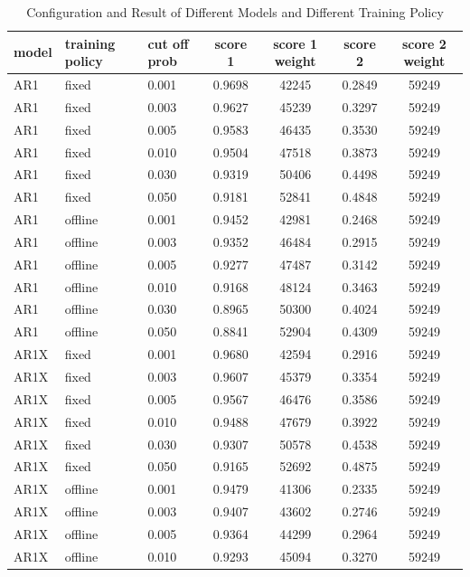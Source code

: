 \documentclass{article}
\begin{document}
\begin{longtable}[htbp]{l|l|l|*{4}{c}}
    \caption{Configuration and Result of Different Models and Different Training Policy}
    \label{tab:tab1.5.3} \\
    \textbf{model} & \textbf{training policy} & \textbf{cut off prob} &
    \textbf{score 1} & \textbf{score 1 weight} & \textbf{score 2} &
    \textbf{score 2 weight} \\
    \hline
    AR1 & fixed & 0.001 & 0.9698 & 42245 & 0.2849 & 59249\\
    AR1 & fixed & 0.003 & 0.9627 & 45239 & 0.3297 & 59249\\
    AR1 & fixed & 0.005 & 0.9583 & 46435 & 0.3530 & 59249\\
    AR1 & fixed & 0.010 & 0.9504 & 47518 & 0.3873 & 59249\\
    AR1 & fixed & 0.030 & 0.9319 & 50406 & 0.4498 & 59249\\
    AR1 & fixed & 0.050 & 0.9181 & 52841 & 0.4848 & 59249\\
    AR1 & offline & 0.001 & 0.9452 & 42981 & 0.2468 & 59249\\
    AR1 & offline & 0.003 & 0.9352 & 46484 & 0.2915 & 59249\\
    AR1 & offline & 0.005 & 0.9277 & 47487 & 0.3142 & 59249\\
    AR1 & offline & 0.010 & 0.9168 & 48124 & 0.3463 & 59249\\
    AR1 & offline & 0.030 & 0.8965 & 50300 & 0.4024 & 59249\\
    AR1 & offline & 0.050 & 0.8841 & 52904 & 0.4309 & 59249\\
    AR1X & fixed & 0.001 & 0.9680 & 42594 & 0.2916 & 59249\\
    AR1X & fixed & 0.003 & 0.9607 & 45379 & 0.3354 & 59249\\
    AR1X & fixed & 0.005 & 0.9567 & 46476 & 0.3586 & 59249\\
    AR1X & fixed & 0.010 & 0.9488 & 47679 & 0.3922 & 59249\\
    AR1X & fixed & 0.030 & 0.9307 & 50578 & 0.4538 & 59249\\
    AR1X & fixed & 0.050 & 0.9165 & 52692 & 0.4875 & 59249\\
    AR1X & offline & 0.001 & 0.9479 & 41306 & 0.2335 & 59249\\
    AR1X & offline & 0.003 & 0.9407 & 43602 & 0.2746 & 59249\\
    AR1X & offline & 0.005 & 0.9364 & 44299 & 0.2964 & 59249\\
    AR1X & offline & 0.010 & 0.9293 & 45094 & 0.3270 & 59249\\

\end{longtable}
\end{document}
